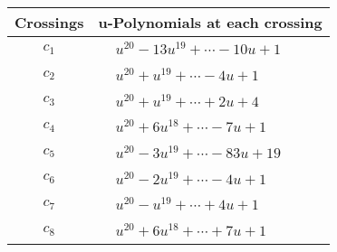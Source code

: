\documentclass[1p]{elsarticle_modified}
\theoremstyle{definition}
\begin{document}
\begin{tabular}{m{50pt}|m{274pt}}
Crossings & \hspace{64pt}u-Polynomials at each crossing \\
\hline $$\begin{aligned}c_{1}\end{aligned}$$&$\begin{aligned}
&u^{20}-13 u^{19}+\cdots-10 u+1
\end{aligned}$\\
\hline $$\begin{aligned}c_{2}\end{aligned}$$&$\begin{aligned}
&u^{20}+u^{19}+\cdots-4 u+1
\end{aligned}$\\
\hline $$\begin{aligned}c_{3}\end{aligned}$$&$\begin{aligned}
&u^{20}+u^{19}+\cdots+2 u+4
\end{aligned}$\\
\hline $$\begin{aligned}c_{4}\end{aligned}$$&$\begin{aligned}
&u^{20}+6 u^{18}+\cdots-7 u+1
\end{aligned}$\\
\hline $$\begin{aligned}c_{5}\end{aligned}$$&$\begin{aligned}
&u^{20}-3 u^{19}+\cdots-83 u+19
\end{aligned}$\\
\hline $$\begin{aligned}c_{6}\end{aligned}$$&$\begin{aligned}
&u^{20}-2 u^{19}+\cdots-4 u+1
\end{aligned}$\\
\hline $$\begin{aligned}c_{7}\end{aligned}$$&$\begin{aligned}
&u^{20}- u^{19}+\cdots+4 u+1
\end{aligned}$\\
\hline $$\begin{aligned}c_{8}\end{aligned}$$&$\begin{aligned}
&u^{20}+6 u^{18}+\cdots+7 u+1
\end{aligned}$\\

\end{tabular}
\end{document}
